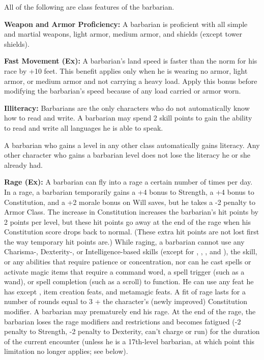 \ClassFeatures

All of the following are class features of the barbarian.

\textbf{Weapon and Armor Proficiency:} A barbarian is proficient with all simple 
and martial weapons, light armor, medium armor, and shields (except tower shields).

\textbf{Fast Movement (Ex):} A barbarian's land speed is faster than the norm for 
his race by +10 feet. This benefit applies only when he is wearing no armor, light 
armor, or medium armor and not carrying a heavy load. Apply this bonus before modifying 
the barbarian's speed because of any load carried or armor worn.

\textbf{Illiteracy:} Barbarians are the only characters who do not automatically 
know how to read and write. A barbarian may spend 2 skill points to gain the ability 
to read and write all languages he is able to speak.

A barbarian who gains a level in any other class automatically gains literacy. 
Any other character who gains a barbarian level does not lose the literacy he or 
she already had.

\textbf{Rage (Ex):} A barbarian can fly into a rage a certain number of times per 
day. In a rage, a barbarian temporarily gains a +4 bonus to Strength, a +4 bonus 
to Constitution, and a +2 morale bonus on Will saves, but he takes a -2 penalty 
to Armor Class. The increase in Constitution increases the barbarian's hit points 
by 2 points per level, but these hit points go away at the end of the rage when 
his Constitution score drops back to normal. (These extra hit points are not lost 
first the way temporary hit points are.) While raging, a barbarian cannot use any 
Charisma-, Dexterity-, or Intelligence-based skills (except for , , , and ), the  skill, or any abilities that require 
patience or concentration, nor can he cast spells or activate magic items that 
require a command word, a spell trigger (such as a wand), or spell completion (such 
as a scroll) to function. He can use any feat he has except , item 
creation feats, and metamagic feats. A fit of rage lasts for a number of rounds 
equal to 3 + the character's (newly improved) Constitution modifier. A barbarian 
may prematurely end his rage. At the end of the rage, the barbarian loses the rage 
modifiers and restrictions and becomes fatigued (-2 penalty to Strength, -2 penalty 
to Dexterity, can't charge or run) for the duration of the current encounter (unless 
he is a 17th-level barbarian, at which point this limitation no longer applies; 
see below).

